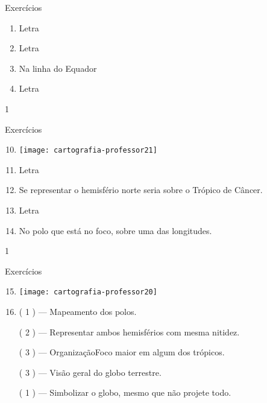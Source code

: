 {\begin{answer}{Exercícios}
{\begin{enumerate}
	\item Letra 

	\item Letra 

	\item Na linha do Equador

	\item  Letra 
	\end{enumerate}
}{1}
\end{answer}
\clearmargin
\begin{answer}{Exercícios}
{
	\exerciselist
	\begin{enumerate}\setcounter{enumi}{9}
	\item 
	{
	\texttt{[image: cartografia-professor21]}
	}

	\item Letra 

	\item Se representar o hemisfério norte seria sobre o Trópico de Câncer.

	\item Letra 

	\item No polo que está no foco, sobre uma das longitudes.

	\end{enumerate}
}{1}
\end{answer}
\clearmargin
\begin{answer}{Exercícios}
{
	\exerciselist
	\begin{enumerate}\setcounter{enumi}{14}
	\item 
	{
	\texttt{[image: cartografia-professor20]}
	}

	\vspace{3em}
 	\item 
	({ }{1}{ }) --- Mapeamento dos polos.

	({ }{2}{ }) --- Representar ambos hemisférios com mesma nitidez.

	({ }{3}{ }) --- OrganizaçãoFoco maior em algum dos trópicos.

	({ }{3}{ }) --- Visão geral do globo terrestre.

	({ }{1}{ }) --- Simbolizar o globo, mesmo que não projete todo.
	\end{enumerate}

}
\end{answer}}
